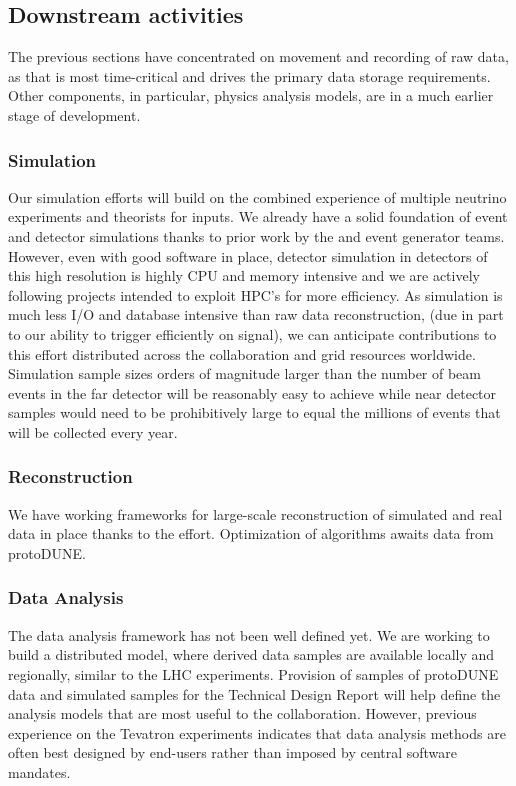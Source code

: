 \subsection{Downstream activities}

The previous sections have concentrated on movement and recording of raw data, as that is most time-critical and drives the primary data storage requirements. Other components, in particular, physics analysis models, are in a much earlier stage of development.

\subsubsection{Simulation}  Our simulation efforts will build on the combined experience of multiple neutrino experiments and theorists for inputs.  We already have a solid foundation of event and detector simulations thanks to prior work by the  and event generator teams.  However,   even with good software in place, detector simulation in detectors of this high resolution is highly CPU and memory intensive and we are actively following projects intended to exploit HPC's for more efficiency.  As simulation is much less I/O and database intensive than raw data reconstruction, (due in part to our ability to trigger efficiently on signal), we can anticipate contributions to this effort distributed across the collaboration and grid resources worldwide. Simulation sample sizes orders of magnitude larger than the number of beam events  in the  far detector will be reasonably easy to achieve while near detector samples would need to be prohibitively large to equal the millions of events that will be collected every year. 

\subsubsection{Reconstruction} We have working frameworks for large-scale reconstruction of simulated and real data in place thanks to the  effort.  Optimization of algorithms awaits data from protoDUNE. 
 
 \subsubsection{Data Analysis}
 The data analysis framework has not been well defined yet.  We are working to build a distributed model, where derived data samples are available locally and regionally, similar to the LHC experiments.   Provision of samples  of protoDUNE data and simulated samples for the Technical Design Report will help define the analysis models that are most useful to the collaboration. However,  previous experience on the Tevatron experiments indicates that data analysis methods are often best designed by end-users rather than imposed by central software mandates. 
 
